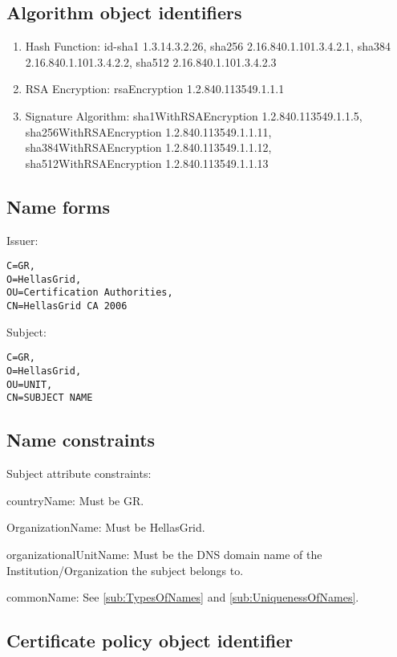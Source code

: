 \subsection{Algorithm object identifiers}

\begin{enumerate}
\item{Hash Function: id-sha1 1.3.14.3.2.26, sha256 2.16.840.1.101.3.4.2.1, sha384 2.16.840.1.101.3.4.2.2, sha512 2.16.840.1.101.3.4.2.3}
\item{RSA Encryption: rsaEncryption 1.2.840.113549.1.1.1}
\item{Signature Algorithm: sha1WithRSAEncryption 1.2.840.113549.1.1.5, sha256WithRSAEncryption 1.2.840.113549.1.1.11, sha384WithRSAEncryption 1.2.840.113549.1.1.12, sha512WithRSAEncryption 1.2.840.113549.1.1.13}
\end{enumerate}

\subsection{Name forms}

Issuer:

\begin{verbatim}
C=GR,
O=HellasGrid,
OU=Certification Authorities,
CN=HellasGrid CA 2006
\end{verbatim}

Subject:

\begin{verbatim}
C=GR,
O=HellasGrid,
OU=UNIT,
CN=SUBJECT NAME
\end{verbatim}

\subsection{Name constraints}

Subject attribute constraints:

countryName:
Must be GR.

OrganizationName:
Must be HellasGrid.

organizationalUnitName:
Must be the DNS domain name of the Institution/Organization the subject belongs to.

commonName:
See \ref{sub:TypesOfNames} and \ref{sub:UniquenessOfNames}.


\subsection{Certificate policy object identifier}


